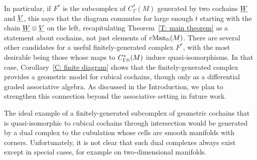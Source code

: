 In particular, if $F^*$ is the subcomplex of $C^*_\Gamma(M)$ generated by two cochains $\underline{W}$ and $\underline{V}$, this says that the diagram
commutes for large enough $t$ starting with the chain $\underline{W}\otimes\underline{V}$ on the left, recapitulating Theorem~\ref{T: main theorem} as a statement about cochains, not just elements of $\mathrm{cMan}_\pitchfork(M)$.
There are several other candidates for a useful finitely-generated complex $F^*$,
with the most desirable being those whose maps to $C^*_{\Gamma \pitchfork}(M)$ induce quasi-isomorphisms.
In that case, Corollary~\ref{C: finite diagram}
shows that the finitely-generated complex provides a geometric model for cubical cochains, though only as a differential graded associative algebra.
As discussed in the Introduction, we plan to strengthen this connection beyond the associative setting in future work.

The ideal example of a finitely-generated subcomplex of geometric cochains that is quasi-isomorphic to cubical cochains through intersection
would be generated by a dual complex to the cubulation whose cells are smooth manifolds with corners.
Unfortunately, it is not clear that such dual complexes always exist except in special cases, for example on two-dimensional manifolds.

